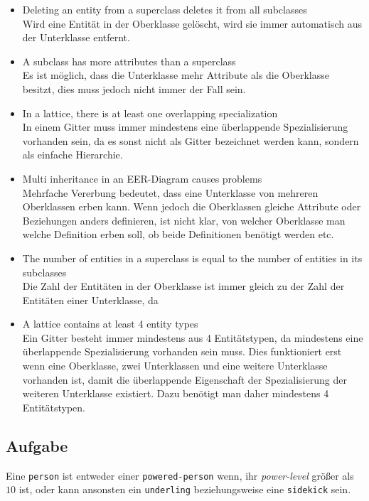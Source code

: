 \documentclass[11pt,a4paper,DIV=9]{scrartcl}
\newcounter{temp}
\newcommand{\aufgabe}[1]{
  \setcounter{temp}{\value{subsection}}
  \setcounter{subsection}{#1}
  \addtocounter{subsection}{-1}
  \subsection{Aufgabe}
  \setcounter{subsection}{\value{temp}}
}
\begin{document}
\begin{itemize}
 \item Deleting an entity from a superclass deletes it from all subclasses
 \\ Wird eine Entit\"at in der Oberklasse gel\"oscht, wird sie immer automatisch aus der Unterklasse entfernt. \\
 \item A subclass has more attributes than a superclass
 \\ Es ist m\"oglich, dass die Unterklasse mehr Attribute als die Oberklasse besitzt, dies muss jedoch nicht immer der Fall sein. \\
 \item In a lattice, there is at least one overlapping specialization
 \\ In einem Gitter muss immer mindestens eine \"uberlappende Spezialisierung vorhanden sein, da es sonst nicht als Gitter bezeichnet werden kann, sondern als einfache Hierarchie. \\
 \item Multi inheritance in an EER-Diagram causes problems
 \\ Mehrfache Vererbung bedeutet, dass eine Unterklasse von mehreren Oberklassen erben kann. Wenn jedoch die Oberklassen gleiche Attribute oder Beziehungen anders definieren, ist nicht klar, von welcher Oberklasse man welche Definition erben soll, ob beide Definitionen ben\"otigt werden etc. \\
 \item The number of entities in a superclass is equal to the number of entities in its subclasses
 \\ Die Zahl der Entit\"aten in der Oberklasse ist immer gleich zu der Zahl der Entit\"aten einer Unterklasse, da
 \item A lattice contains at least 4 entity types
 \\ Ein Gitter besteht immer mindestens aus 4 Entit\"atstypen, da mindestens eine \"uberlappende Spezialisierung vorhanden sein muss. Dies funktioniert erst wenn eine Oberklasse, zwei Unterklassen und eine weitere Unterklasse vorhanden ist, damit die \"uberlappende Eigenschaft der Spezialisierung der weiteren Unterklasse existiert. Dazu ben\"otigt man daher mindestens 4 Entit\"atstypen. \\
\end{itemize}
\aufgabe{4}
  Eine \texttt{person} ist entweder einer \texttt{powered-person} wenn, ihr \textit{power-level} größer als $10$ ist, oder kann ansonsten ein \texttt{underling} beziehungsweise eine \texttt{sidekick} sein.
\end{document}
